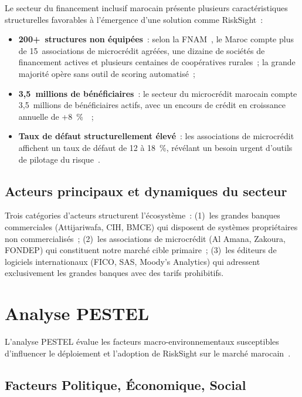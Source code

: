 \documentclass[12pt, a4paper]{report}
\begin{document}
Le secteur du financement inclusif marocain présente plusieurs caractéristiques
structurelles favorables à l'émergence d'une solution comme RiskSight~:

\begin{itemize}[leftmargin=1.5em]
  \item \textbf{200+~structures non équipées}~: selon la FNAM~\cite{fnam},
    le Maroc compte plus de 15~associations de microcrédit agréées, une dizaine
    de sociétés de financement actives et plusieurs centaines de coopératives
    rurales~; la grande majorité opère sans outil de scoring automatisé~;
  \item \textbf{3,5~millions de bénéficiaires}~: le secteur du microcrédit marocain
    compte 3,5~millions de bénéficiaires actifs, avec un encours de crédit en
    croissance annuelle de +8~\%~\cite{bam_rapport}~;
  \item \textbf{Taux de défaut structurellement élevé}~: les associations de
    microcrédit affichent un taux de défaut de 12 à 18~\%, révélant un besoin urgent
    d'outils de pilotage du risque~\cite{bam_rapport,fnam}.
\end{itemize}

\subsection{Acteurs principaux et dynamiques du secteur}

Trois catégories d'acteurs structurent l'écosystème~: (1)~les grandes banques
commerciales (Attijariwafa, CIH, BMCE) qui disposent de systèmes propriétaires non
commercialisés~; (2)~les associations de microcrédit (Al Amana, Zakoura, FONDEP)
qui constituent notre marché cible primaire~; (3)~les éditeurs de logiciels
internationaux (FICO, SAS, Moody's Analytics) qui adressent exclusivement les
grandes banques avec des tarifs prohibitifs.

\section{Analyse PESTEL}

L'analyse PESTEL évalue les facteurs macro-environnementaux susceptibles
d'influencer le déploiement et l'adoption de RiskSight sur le marché
marocain~\cite{tp3_faisabilite,guide_pfa}.

\subsection{Facteurs Politique, Économique, Social}
\end{document}

